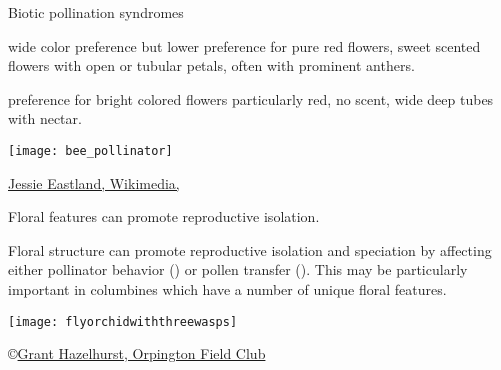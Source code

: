 \documentclass[t,hidelinks]{beamer}
\begin{document}
\begin{frame}[t]{Biotic pollination syndromes}

	\begin{multicols}{2}
	\hangpara {} wide color preference but lower preference for pure red flowers, sweet scented flowers with open or tubular petals, often with prominent anthers. %
	
	\hangpara {} preference for bright colored flowers particularly red, no scent, wide deep tubes with nectar. %

	\columnbreak
	
		\texttt{[image: bee\_pollinator]}
	
	\end{multicols}
	
	\vfilll
	
	\hfill \tiny \href{https://commons.wikimedia.org/wiki/File:Diadasia_Bee_Straddles_Cactus_Flower_Carpels_close-up.jpg}{Jessie Eastland, Wikimedia, }
\end{frame}
%
%
%	
%	
%	
%
%
%	
%
\begin{frame}[t]{Floral features can promote reproductive isolation.}
	
	\begin{multicols}{2}
	\hangpara Floral structure can promote reproductive isolation and speciation by affecting either pollinator behavior () or pollen transfer (). This may be particularly important in columbines which have a number of unique floral features.  

	\columnbreak
	
		\texttt{[image: flyorchidwiththreewasps]}	
	\end{multicols}

	\vfilll
	
	\hfill \tiny \copyright \href{http://www.orpingtonfieldclub.org.uk/ofc-article002.html}{Grant Hazelhurst, Orpington Field Club}
\end{frame}
\end{document}
